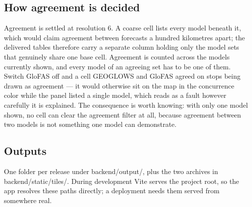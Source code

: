 

\subsection{How agreement is decided}\label{how-agreement-is-decided}

Agreement is settled at resolution 6. A coarse cell lists every model beneath it, which would claim agreement between forecasts a hundred kilometres apart; the delivered tables therefore carry a separate column holding only the model sets that genuinely share one base cell.
Agreement is counted across the models currently shown, and every model of an agreeing set has to be one of them.
Switch GloFAS off and a cell GEOGLOWS and GloFAS agreed on stops being drawn as agreement --- it would otherwise sit on the map in the concurrence color while the panel listed a single model, which reads as a fault however carefully it is explained.
The consequence is worth knowing: with only one model shown, no cell can clear the agreement filter at all, because agreement between two models is not something one model can demonstrate.

\subsection{Outputs}\label{outputs}

One folder per release under backend/output/, plus the two archives in backend/static/tiles/.
During development Vite serves the project root, so the app resolves these paths directly; a deployment needs them served from somewhere real.

